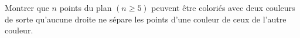 Montrer que $n$ points du plan $(n \geq 5)$ peuvent être coloriés avec deux couleurs de sorte qu'aucune droite ne sépare les points d'une couleur de ceux de l'autre couleur.
